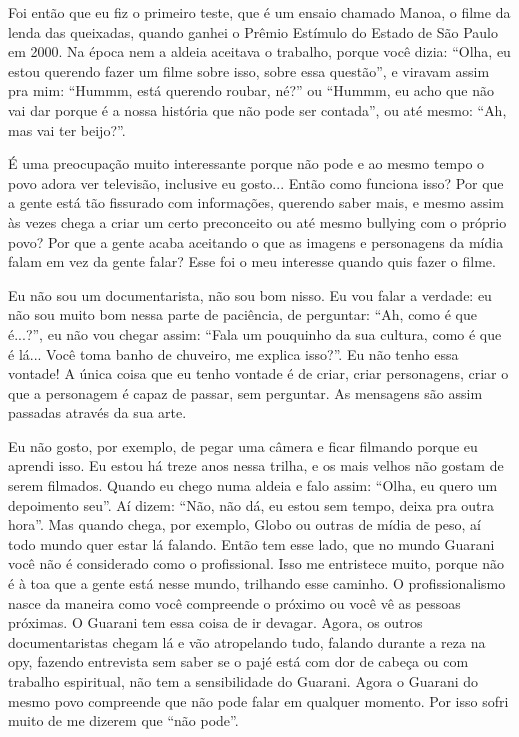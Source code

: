 \documentclass{article}
\begin{document}
Foi ent\~ao que eu fiz o primeiro teste, que \'e um ensaio chamado
Manoa, o filme da lenda das queixadas, quando ganhei o Pr\^emio
Est\'imulo do Estado de S\~ao Paulo em 2000. Na \'epoca nem a aldeia
aceitava o trabalho, porque voc\^e dizia: {\textquotedblleft}Olha, eu
estou querendo fazer um filme sobre isso, sobre essa
quest\~ao{\textquotedblright}, e viravam assim pra mim:
{\textquotedblleft}Hummm, est\'a querendo roubar,
n\'e?{\textquotedblright} ou {\textquotedblleft}Hummm, eu acho que
n\~ao vai dar porque \'e a nossa hist\'oria que n\~ao pode ser
contada{\textquotedblright}, ou at\'e mesmo: {\textquotedblleft}Ah, mas
vai ter beijo?{\textquotedblright}.

\'E uma preocupa\c{c}\~ao muito interessante porque n\~ao pode e ao
mesmo tempo o povo adora ver televis\~ao, inclusive eu gosto... Ent\~ao
como funciona isso? Por que a gente est\'a t\~ao fissurado com
informa\c{c}\~oes, querendo saber mais, e mesmo assim \`as vezes chega
a criar um certo preconceito ou at\'e mesmo bullying com o pr\'oprio
povo? Por que a gente acaba aceitando o que as imagens e personagens da
m\'idia falam em vez da gente falar? Esse foi o meu interesse quando
quis fazer o filme. 

Eu n\~ao sou um documentarista, n\~ao sou bom nisso. Eu vou falar a
verdade: eu n\~ao sou muito bom nessa parte de paci\^encia, de
perguntar: {\textquotedblleft}Ah, como \'e que
\'e...?{\textquotedblright}, eu n\~ao vou chegar assim:
{\textquotedblleft}Fala um pouquinho da sua cultura, como \'e que \'e
l\'a... Voc\^e toma banho de chuveiro, me explica
isso?{\textquotedblright}. Eu n\~ao tenho essa vontade! A \'unica coisa
que eu tenho vontade \'e de criar, criar personagens, criar o que a
personagem \'e capaz de passar, sem perguntar. As mensagens s\~ao assim
passadas atrav\'es da sua arte. 

Eu n\~ao gosto, por exemplo, de pegar uma c\^amera e ficar filmando
porque eu aprendi isso. Eu estou h\'a treze anos nessa trilha, e os
mais velhos n\~ao gostam de serem filmados. Quando eu chego numa aldeia
e falo assim: {\textquotedblleft}Olha, eu quero um depoimento
seu{\textquotedblright}. A\'i dizem: {\textquotedblleft}N\~ao, n\~ao
d\'a, eu estou sem tempo, deixa pra outra hora{\textquotedblright}. Mas
quando chega, por exemplo, Globo ou outras de m\'idia de peso, a\'i
todo mundo quer estar l\'a falando. Ent\~ao tem esse lado, que no mundo
Guarani voc\^e n\~ao \'e considerado como o profissional. Isso me
entristece muito, porque n\~ao \'e \`a toa que a gente est\'a nesse
mundo, trilhando esse caminho. O profissionalismo nasce da maneira como
voc\^e compreende o pr\'oximo ou voc\^e v\^e as pessoas pr\'oximas. O
Guarani tem essa coisa de ir devagar. Agora, os outros documentaristas
chegam l\'a e v\~ao atropelando tudo, falando durante a reza na opy,
fazendo entrevista sem saber se o paj\'e est\'a com dor de cabe\c{c}a
ou com trabalho espiritual, n\~ao tem a sensibilidade do Guarani. Agora
o Guarani do mesmo povo compreende que n\~ao pode falar em qualquer
momento. Por isso sofri muito de me dizerem que
{\textquotedblleft}n\~ao pode{\textquotedblright}.
\end{document}
